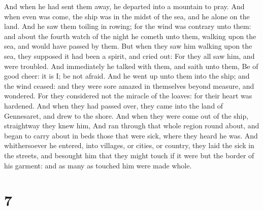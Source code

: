 And when he had sent them away, he departed into a mountain to pray.
 And when even was come, the ship was in the midst of the
sea, and he alone on the land.  And he saw them toiling in
rowing; for the wind was contrary unto them: and about the fourth watch
of the night he cometh unto them, walking upon the sea, and would have
passed by them.  But when they saw him walking upon the
sea, they supposed it had been a spirit, and cried out: 
For they all saw him, and were troubled. And immediately he talked with
them, and saith unto them, Be of good cheer: it is I; be not afraid.
 And he went up unto them into the ship; and the wind
ceased: and they were sore amazed in themselves beyond measure, and
wondered.  For they considered not the miracle of the
loaves: for their heart was hardened.  And when they had
passed over, they came into the land of Gennesaret, and drew to the
shore.  And when they were come out of the ship,
straightway they knew him,  And ran through that whole
region round about, and began to carry about in beds those that were
sick, where they heard he was.  And whithersoever he
entered, into villages, or cities, or country, they laid the sick in the
streets, and besought him that they might touch if it were but the
border of his garment: and as many as touched him were made whole.

\hypertarget{section-6}{%
\section{7}\label{section-6}}

